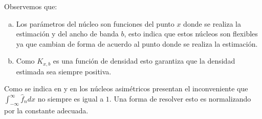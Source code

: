 Observemos que: 
\begin{enumerate}[a)] 
	\item Los parámetros del núcleo son funciones del punto $x$ donde se realiza la estimación y del ancho de banda $b$, esto indica que estos núcleos son flexibles ya que cambian de forma de acuerdo al punto donde se realiza la estimación.
	\item Como $K_{x,b}$ es una función de densidad esto garantiza que la densidad estimada sea siempre positiva. 
\end{enumerate}

Como se indica en \citet{Libnegue2013} y en \citet{Hirukawa2018} los núcleos asimétricos presentan el inconveniente que $\int_{-\infty}^{\infty} \widehat{f}_n dx$ no siempre es igual a $1$. Una forma de resolver esto es normalizando por la constante adecuada.

